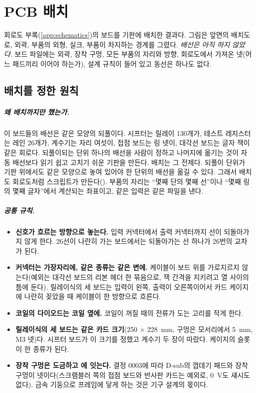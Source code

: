 \chapter{PCB 배치}\label{app:pcb}

회로도 부록(\ref{app:schematics})의 보드를 기판에 배치한 결과다. 그림은 앞면의 배치도로, 외곽, 부품의 외형,
실크, 부품이 차지하는 경계를 그렸다. \emph{배선은 아직 하지 않았다.} 보드 파일에는 외곽, 장착 구멍, 모든 부품의
자리와 방향, 회로도에서 가져온 넷(어느 패드끼리 이어야 하는가), 설계 규칙이 들어 있고 동선은 하나도 없다.

\section{배치를 정한 원칙}

\paragraph{왜 배치까지만 했는가.} 이 보드들의 배선은 같은 모양의 되풀이다. 시프터는 릴레이 130개가, 테스트
레지스터는 레인 26개가, 계수기는 자리 여섯이, 접점 보드는 링 넷이, 대각선 보드는 글자 잭이 같은 회로다.
되풀이되는 단위 하나의 배선을 사람이 정하고 나머지에 옮기는 것이 자동 배선보다 읽기 쉽고 고치기 쉬운 기판을
만든다. 배치는 그 전제다. 되풀이 단위가 기판 위에서도 같은 모양으로 놓여 있어야 한 단위의 배선을 옮길 수 있다.
그래서 배치도 회로도처럼 스크립트가 만든다(). 부품의 자리는 ``몇째 단의 몇째 선''이나
``몇째 링의 몇째 글자''에서 계산되는 좌표이고, 같은 입력은 같은 파일을 낸다.

\paragraph{공통 규칙.}
\begin{itemize}
\item \textbf{신호가 흐르는 방향으로 놓는다.} 입력 커넥터에서 출력 커넥터까지 선이 되돌아가지 않게 한다. 26선이
나란히 가는 보드에서는 되돌아가는 선 하나가 26번의 교차가 된다.
\item \textbf{커넥터는 가장자리에, 같은 종류는 같은 변에.} 케이블이 보드 위를 가로지르지 않는다(예외는 대각선 보드의
리본 헤더 한 묶음으로, 잭 간격을 지키려고 열 사이의 틈에 둔다). 릴레이식의 세
보드는 입력이 왼쪽, 출력이 오른쪽이어서 카드 케이지에 나란히 꽂았을 때 케이블이 한 방향으로 흐른다.
\item \textbf{코일의 다이오드는 코일 옆에.} 코일이 꺼질 때의 전류가 도는 고리를 작게 한다.
\item \textbf{릴레이식의 세 보드는 같은 카드 크기}(250 × 228~mm, 구멍은 모서리에서 5~mm, M3 넷)다. 시프터 보드가
이 크기를 정했고 계수기 두 장이 따랐다. 케이지의 슬롯이 한 종류가 된다.
\item \textbf{장착 구멍은 도금하고 에 잇는다.} 결정 0003에 따라 D-sub의 껍데기 패드와 장착 구멍이
 넷이다(스크램블러 쪽의 접점 보드와 반사판 카드는 예외로, 0~V도 섀시도 없다). 금속 기둥으로 프레임에
닿게 하는 것은 기구 설계의 몫이다.
\end{itemize}

